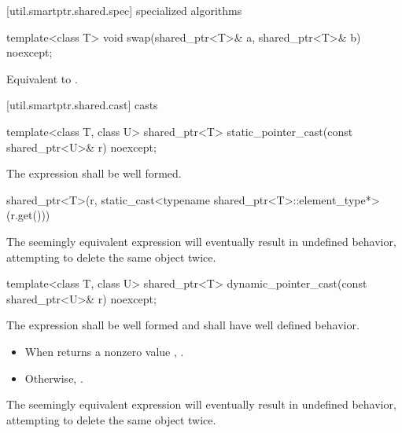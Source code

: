 [util.smartptr.shared.spec]{ specialized algorithms}

%
\begin{itemdecl}
template<class T>
  void swap(shared_ptr<T>& a, shared_ptr<T>& b) noexcept;
\end{itemdecl}

\begin{itemdescr}
\pnum\effects  Equivalent to .
\end{itemdescr}

[util.smartptr.shared.cast]{ casts}

%
\begin{itemdecl}
template<class T, class U>
  shared_ptr<T> static_pointer_cast(const shared_ptr<U>& r) noexcept;
\end{itemdecl}

\begin{itemdescr}
\pnum
\requires The expression  shall
be well formed.

\pnum
\returns
\begin{codeblock}
shared_ptr<T>(r, static_cast<typename shared_ptr<T>::element_type*>(r.get()))
\end{codeblock}

\pnum
\begin{note}
The seemingly equivalent expression
will eventually result in undefined behavior, attempting to delete the
same object twice.
\end{note}
\end{itemdescr}

%
\begin{itemdecl}
template<class T, class U>
  shared_ptr<T> dynamic_pointer_cast(const shared_ptr<U>& r) noexcept;
\end{itemdecl}

\begin{itemdescr}
\pnum
\requires The expression 
shall be well formed and shall have well defined behavior.

\pnum
\returns
\begin{itemize}
\item When 
returns a nonzero value , .
\item Otherwise, .
\end{itemize}

\pnum
\begin{note}
The seemingly equivalent expression
 will eventually result in
undefined behavior, attempting to delete the same object twice.
\end{note}
\end{itemdescr}

